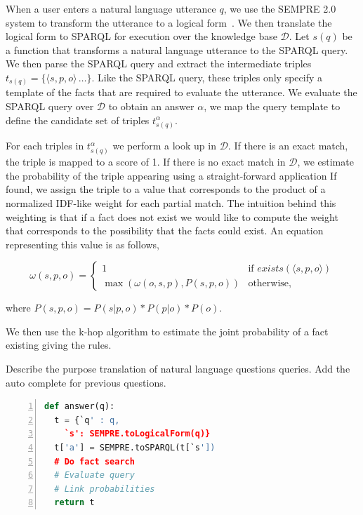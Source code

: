 When a user enters a natural language utterance \(q\), we use the SEMPRE 2.0 system to transform the utterance to a logical form~\cite{berant2013freebase,berant2013semantic}.
We then translate the logical form to SPARQL for execution over the knowledge base \(\mathcal{D}\).
Let \(s(q)\) be a function that transforms a natural language utterance to the SPARQL query.
We then parse the SPARQL query and extract the intermediate triples \( t_{s(q)} = \{\langle s,p,o\rangle\, \ldots \}\). 
Like the SPARQL query, these triples only specify a template of the facts that are required to evaluate the utterance.
We evaluate the SPARQL query over \(\mathcal{D}\) to obtain an answer \( \alpha \), we map the query template to define the candidate set of triples \( t^\alpha_{s(q)} \).

For each triples in \( t^\alpha_{s(q)} \) we perform a look up in \(\mathcal{D}\).
If there is an exact match, the triple is mapped to a score of 1.
If there is no exact match in \(\mathcal{D}\), we estimate the probability of the triple appearing using a straight-forward application
If found, we assign the triple to a value that corresponds to the product of a normalized IDF-like weight for each partial match.
The intuition behind this weighting is that if a fact does not exist we would like to compute the weight that corresponds to the possibility that the facts could exist.
An equation representing this value is as follows,

\[
  \omega(s,p,o) = \begin{cases}
    1 & \mbox{if } exists(\langle s,p,o \rangle) \\ 
    \max( \omega(o,s,p), P(s,p,o)) & \mbox{otherwise,}
  \end{cases}
\]

where \( P(s,p,o) = P(s|p,o) * P(p|o) * P(o) \).

We then use the k-hop algorithm to estimate the joint probability of a fact existing giving the rules.


Describe the purpose translation of natural language questions queries.
Add the auto complete for previous questions.


\begin{lstlisting}[language=Python,frame=single,numbers=left,label=probqa-algo,caption={Algorithm for obtaining the information}]
def answer(q):
  t = {`q' : q,
    `s': SEMPRE.toLogicalForm(q)}
  t['a'] = SEMPRE.toSPARQL(t[`s'])
  # Do fact search
  # Evaluate query
  # Link probabilities
  return t

\end{lstlisting}



